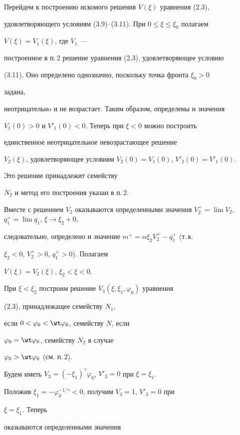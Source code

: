 Перейдем к построению искомого решения $V(\xi)$ уравнения (2.3), 


удовлетворяющего условиям (3.9)--(3.11). При $0\le\xi\le\xi_0$ полагаем 


$V(\xi)=V_1(\xi)$, где $V_1$ --- 


построенное в п.\,2 решение уравнения (2.3), удовлетворяющее условию 


(3.11). Оно определено однозначно, поскольку точка фронта $\xi_0>0$ 


задана, 


неотрицательнo и не возрастает. Таким образом, определены и значения 


$V_1(0)>0$ и $V'_1(0)<0$. Теперь при $\xi<0$ можно построить


единственное неотрицательное невозрастающее решение 


$V_2(\xi)$, удовлетворяющее условиям $V_2(0)=V_1(0)$, $V'_2(0)=V'_1(0)$. 


Это решение принадлежит семейству 


$N_2$ и метод его построения указан в п.\,2. 


 


Вместе с решением $V_2$ оказываются определенными значения $V^+_2=\lim 


V_2$, $q^+_1=\lim q_1$, $\xi\to\xi_2+0$, 


следовательно, определено и значение $m^+=\alpha\xi_2V^+_2-q^+_1$ (т.\,к. 


$\xi_2<0$, $V^+_2>0$, $q^+_1>0$). Полагаем 


$V(\xi)=V_2(\xi)$, $\xi_2<\xi<0$. 


 


При $\xi<\xi_2$ построим решение $V_3(\xi,\xi_1,\varphi_0)$ уравнения 


(2.3), принадлежащее семейству $N_1$, 


если $0<\varphi_0<\wt\varphi_0$, семейству $N$, если 


$\varphi_0=\wt\varphi_0$, семейству $N_2$ в случае 


$\varphi_0>\wt\varphi_0$ (см. п.\,2). 


Будем иметь $V_3=(-\xi_1)^\gamma \varphi_0$, $V'_3=0$ при $\xi=\xi_1$. 


Положив $\xi_1=-\varphi^{-1/\gamma}_0<0$, получим $V_3=1$, $V'_3=0$ при 


$\xi=\xi_1$. Теперь 


оказываются определенными значения 


